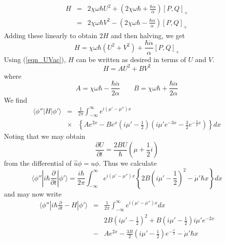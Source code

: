 \documentclass[11pt, a4paper, titlepage]{article}
\newcommand{\pd}{\partial}
\newcommand{\lb}{\left(}
\newcommand{\rb}{\right)}
\newcommand{\acb}[2]{\left[ #1 , #2 \right]_+}
\newcommand{\eqn}[1]{(\ref{#1})}
\begin{document}
\begin{eqnarray}
  \label{eqn_HU2}
    H &=& 2\chi\omega\hbar U^2 + \lb 2\chi\omega\hbar + \frac{\hbar\dot{\alpha}}{\alpha}\rb \acb P Q \\
  \label{eqn_HV2}
      &=& 2\chi\omega\hbar V^2 - \lb 2\chi\omega\hbar - \frac{\hbar\dot{\alpha}}{\alpha}\rb \acb P Q
\end{eqnarray}
Adding these linearly to obtain $2H$ and then halving, we get
\begin{equation}
   \label{eqn_HUV1}
    H = \chi\omega\hbar \lb U^2 + V^2 \rb + \frac{\hbar\dot{\alpha}}{\alpha}\acb P Q
\end{equation}
Using \eqn{eqn_UVac}, $H$ can be written as desired in terms of $U$
and $V$. 
\begin{equation}
   \label{eqn_HUV}
    H = A U^2 + B V^2
\end{equation}
where
\begin{equation}
   \label{eqn_AandB}
    A = \chi\omega\hbar - \frac{\hbar\dot{\alpha}}{2\alpha}
    \qquad
    B = \chi\omega\hbar + \frac{\hbar\dot{\alpha}}{2\alpha}
\end{equation}
We find
\begin{eqnarray}
  \label{eqn_phiHphi}
   \langle \phi''|H|\phi' \rangle &=&
   \frac{1}{2\pi}\int^\infty_{-\infty}
   e^{i\lb\mu' - \mu'' \rb x} \\
   &\times&
   \left\{
     Ae^{2x} - Be^x\lb i\mu'-\frac{1}{2}\rb\lb i\mu'e^{-3x}-\frac{3}{2}e^{-\frac{3}{2}x}\rb
   \right\}
   dx \nonumber
\end{eqnarray}
Noting that we may obtain
\begin{equation}
   \label{eqn_partialU}
    \frac{\pd U}{\pd t} = \frac{2BU}{\hbar}\lb \mu+\frac{1}{2}i\rb
\end{equation}
from the differential of $\hat{u}\phi=u\phi$. Thus we calculate
\begin{equation}
  \label{eqn_ddt}
   \langle \phi''|i\hbar \frac{\pd }{\pd t}|\phi' \rangle = \frac{i\hbar}{2\pi} \int^\infty_{-\infty}
   e^{i\lb\mu' - \mu'' \rb x}
   \left\{
     2B \lb i\mu' - \frac{1}{2}\rb^2 - \dot{\mu}' \hbar x
   \right\}
   dx
\end{equation}
and may now write
\begin{eqnarray}
  \label{eqn_phiddtHphi}
   \langle \phi''|i\hbar \frac{\partial }{\partial t} - H|\phi' \rangle &=& \frac{1}{2\pi}
   \int^\infty_{-\infty} e^{i\lb\mu' - \mu'' \rb x}dx \\
     &&2B \lb i\mu' - \frac{1}{2}\rb^2 + B \lb i\mu'-\frac{1}{2}\rb i \mu' e^{-2x} \nonumber\\
     &-& Ae^{2x} - \frac{3B}{2} \lb i\mu'-\frac{1}{2}\rb e^{-\frac{x}{2}} - \dot{\mu}' \hbar x \nonumber
\end{eqnarray}
\end{document}
